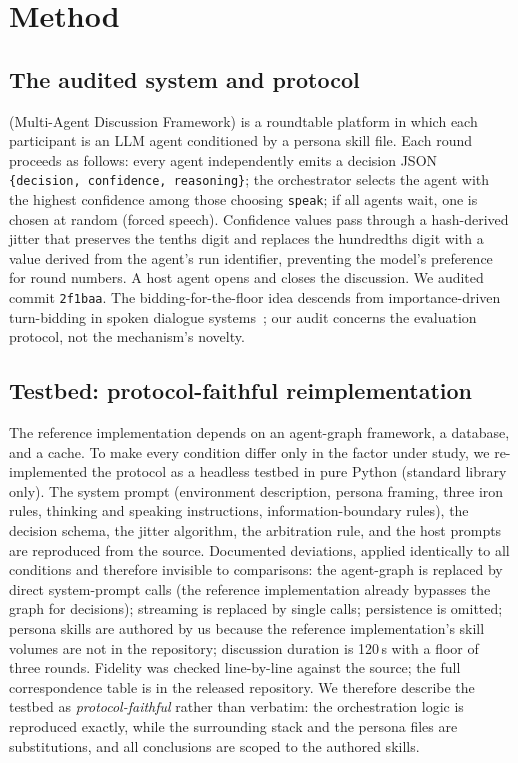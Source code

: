 \section{Method}
\label{sec:method}

\subsection{The audited system and protocol}

\sysname{} (Multi-Agent Discussion Framework) is a roundtable platform
in which each participant is an LLM agent conditioned by a persona skill
file. Each round proceeds as follows: every agent independently emits a
decision JSON \texttt{\{decision, confidence, reasoning\}}; the
orchestrator selects the agent with the highest confidence among those
choosing \texttt{speak}; if all agents wait, one is chosen at random
(forced speech). Confidence values pass through a hash-derived jitter
that preserves the tenths digit and replaces the hundredths digit with a
value derived from the agent's run identifier, preventing the model's
preference for round numbers. A host agent opens and closes the
discussion. We audited commit \texttt{2f1baa}. The bidding-for-the-floor
idea descends from importance-driven turn-bidding in spoken dialogue
systems~\cite{selfridge-heeman-2010-importance}; our audit concerns the
evaluation protocol, not the mechanism's novelty.

\subsection{Testbed: protocol-faithful reimplementation}

The reference implementation depends on an agent-graph framework, a
database, and a cache. To make every condition differ only in the factor
under study, we re-implemented the protocol as a headless testbed in
pure Python (standard library only). The system prompt (environment
description, persona framing, three iron rules, thinking and speaking
instructions, information-boundary rules), the decision schema, the
jitter algorithm, the arbitration rule, and the host prompts are
reproduced from the source. Documented deviations, applied identically
to all conditions and therefore invisible to comparisons: the
agent-graph is replaced by direct system-prompt calls (the reference
implementation already bypasses the graph for decisions); streaming is
replaced by single calls; persistence is omitted; persona skills are
authored by us because the reference implementation's skill volumes are
not in the repository; discussion duration is 120\,s with a floor of
three rounds. Fidelity was checked line-by-line against the source; the
full correspondence table is in the released repository. We therefore
describe the testbed as \emph{protocol-faithful} rather than verbatim:
the orchestration logic is reproduced exactly, while the surrounding
stack and the persona files are substitutions, and all conclusions are
scoped to the authored skills.

